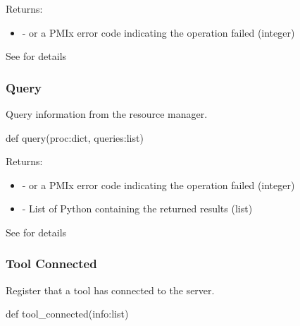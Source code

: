 Returns:
\begin{itemize}
    \item {} -  or a \ac{PMIx} error code indicating the operation failed (integer)
\end{itemize}

See  for details


\subsubsection{Query}

\summary

Query information from the resource manager.

\format

\pyspecificstart
\begin{codepar}
def query(proc:dict, queries:list)
\end{codepar}
\pyspecificend

\begin{arglist}
\end{arglist}

Returns:
\begin{itemize}
    \item {} -  or a \ac{PMIx} error code indicating the operation failed (integer)
    \item {} - List of Python  containing the returned results (list)
\end{itemize}

See  for details


\subsubsection{Tool Connected}

\summary

Register that a tool has connected to the server.

\format

\pyspecificstart
\begin{codepar}
def tool_connected(info:list)
\end{codepar}
\pyspecificend

\begin{arglist}
\end{arglist}

